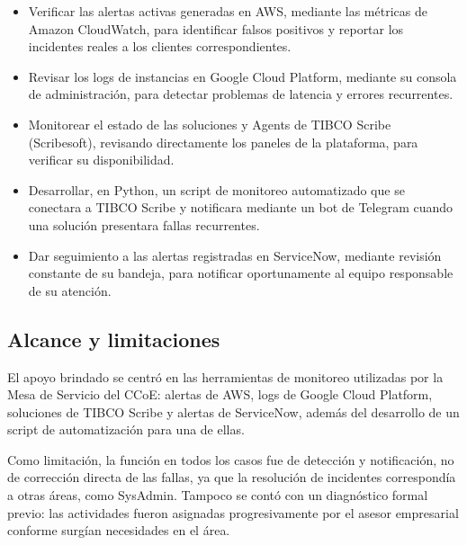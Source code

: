 \begin{itemize}
    \item Verificar las alertas activas generadas en AWS, mediante las métricas de Amazon CloudWatch, para identificar falsos positivos y reportar los incidentes reales a los clientes correspondientes.
    \item Revisar los logs de instancias en Google Cloud Platform, mediante su consola de administración, para detectar problemas de latencia y errores recurrentes.
    \item Monitorear el estado de las soluciones y Agents de TIBCO Scribe (Scribesoft), revisando directamente los paneles de la plataforma, para verificar su disponibilidad.
    \item Desarrollar, en Python, un script de monitoreo automatizado que se conectara a TIBCO Scribe y notificara mediante un bot de Telegram cuando una solución presentara fallas recurrentes.
    \item Dar seguimiento a las alertas registradas en ServiceNow, mediante revisión constante de su bandeja, para notificar oportunamente al equipo responsable de su atención.
\end{itemize}

\subsection{Alcance y limitaciones}
\label{sec:alcance_limitaciones}

El apoyo brindado se centró en las herramientas de monitoreo utilizadas por la Mesa de Servicio del CCoE: alertas de AWS, logs de Google Cloud Platform, soluciones de TIBCO Scribe y alertas de ServiceNow, además del desarrollo de un script de automatización para una de ellas.

Como limitación, la función en todos los casos fue de detección y notificación, no de corrección directa de las fallas, ya que la resolución de incidentes correspondía a otras áreas, como SysAdmin. Tampoco se contó con un diagnóstico formal previo: las actividades fueron asignadas progresivamente por el asesor empresarial conforme surgían necesidades en el área.